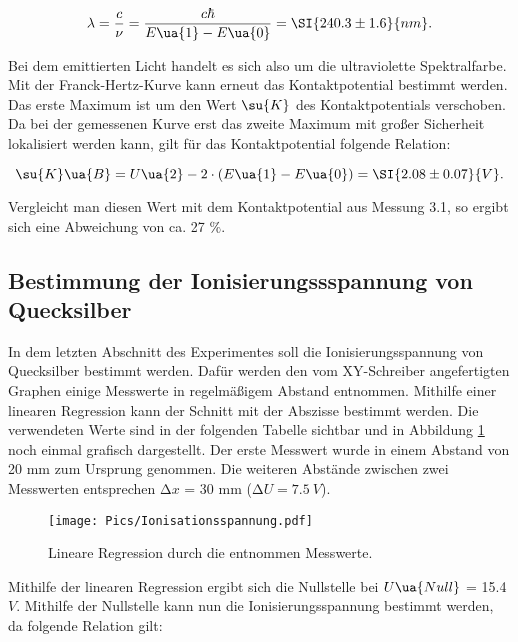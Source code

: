 \begin{equation}
  \lambda = \frac{c}{\nu} = \frac{c \hbar}{E\ua{1} - E\ua{0}} = \SI{240.3 \pm 1.6}{nm}.
\end{equation}

Bei dem emittierten Licht handelt es sich also um die ultraviolette Spektralfarbe.
Mit der Franck-Hertz-Kurve kann erneut das Kontaktpotential bestimmt
werden. Das erste Maximum ist um den Wert $\su{K}$ des Kontaktpotentials verschoben. Da bei der
gemessenen Kurve erst das zweite Maximum mit großer Sicherheit lokalisiert werden
kann, gilt für das Kontaktpotential folgende Relation:

\begin{equation}
  \su{K}\ua{B} = U\ua{2} - 2 \cdot (E\ua{1} - E\ua{0}) = \SI{2.08 \pm 0.07}{V}.
\end{equation}

Vergleicht man diesen Wert mit dem Kontaktpotential aus Messung 3.1, so ergibt
sich eine Abweichung von ca. 27 $\%$.

\subsection{Bestimmung der Ionisierungssspannung von Quecksilber}

In dem letzten Abschnitt des Experimentes soll die Ionisierungsspannung
von Quecksilber bestimmt werden. Dafür werden den vom XY-Schreiber angefertigten
Graphen einige Messwerte in regelmäßigem Abstand entnommen. Mithilfe einer
linearen Regression kann der Schnitt mit der Abszisse bestimmt werden.
Die verwendeten Werte sind in der folgenden Tabelle sichtbar und in Abbildung
\ref{fig:MessungC} noch einmal grafisch dargestellt. Der erste Messwert wurde in
einem Abstand von 20 mm zum Ursprung genommen. Die weiteren Abstände
zwischen zwei Messwerten entsprechen $\increment x$ = 30 mm ($\increment U = \SI{7.5}{V}$).



\begin{figure}
  \centering
  \texttt{[image: Pics/Ionisationsspannung.pdf]}
  \caption{Lineare Regression durch die entnommen Messwerte.}
  \label{fig:MessungC}
\end{figure}

Mithilfe der linearen Regression ergibt sich die Nullstelle bei $U\ua{Null}$ =
15.4 $\si{V}$.
Mithilfe der Nullstelle kann nun die Ionisierungsspannung bestimmt werden, da
folgende Relation gilt:


